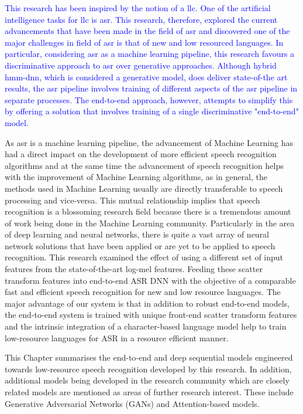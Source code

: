\textcolor{blue}{This research has been inspired by the notion of a \acrfull{llc}. One of the artificial intelligence tasks for \acrshort{llc} is \acrfull{asr}.  This research, therefore, explored the current advancements that have been made in the field of \acrshort{asr} and discovered one of the major challenges in field of \acrshort{asr} is that of new and low resourced languages.  In particular, considering \acrshort{asr} as a machine learning pipeline, this research favours a discriminative approach to \acrshort{asr} over generative approaches.  Although hybrid \acrshort{hmm}-\acrshort{dnn}, which is considered a generative model, does deliver state-of-the art results, the \acrshort{asr} pipeline involves training of different aspects of the \acrshort{asr} pipeline in separate processes.  The end-to-end approach, however, attempts to simplify this by offering a solution that involves training of a single discriminative "end-to-end" model. }

\startblue
As \acrshort{asr} is a machine learning pipeline,  the advancement of Machine Learning has had a direct impact on the development of more efficient speech recognition algorithms and at the same time the advancement of speech recognition helps with the improvement of Machine Learning algorithms, as in general, the methods used in Machine Learning usually are directly transferable to speech processing and vice-versa. This mutual relationship implies that speech recognition is a blossoming research field because there is a tremendous amount of work being done in the Machine Learning community. Particularly in the area of deep learning and neural networks, there is quite a vast array of neural network solutions that have been applied or are yet to be applied to speech recognition. This research examined the effect of using a different set of input features from the state-of-the-art log-mel features. Feeding these scatter transform features into end-to-end ASR DNN with the objective of a comparable fast and efficient speech recognition for new and low resource languages. The major advantage of our system is that in addition to robust end-to-end models, the end-to-end system is trained with unique front-end scatter transform features and the intrinsic integration of a character-based language model help to train low-resource languages for ASR in a resource efficient manner. 

This Chapter summarises the end-to-end and deep sequential models engineered towards low-resource speech recognition developed by this research. In addition, additional models being developed in the research community which are closely related models are mentioned as areas of further research interest.  These include Generative Adversarial Networks (GANs) and Attention-based models. 

